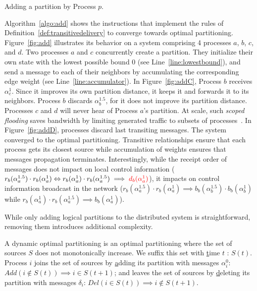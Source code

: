 \begin{algorithm}
  
  \caption{\label{algo:add}Adding a partition by Process $p$.}
\end{algorithm}

Algorithm~\ref{algo:add} shows the instructions that implement the
rules of Definition~\ref{def:transitivedelivery} to converge towards
optimal partitioning. Figure~\ref{fig:add} illustrates its behavior on
a system comprising 4 processes $a$, $b$, $c$, and $d$. Two processes
$a$ and $c$ concurrently create a partition. They initialize their own
state with the lowest possible bound $0$ (see
Line~\ref{line:lowestbound}), and send a message to each of their
neighbors by accumulating the corresponding edge weight (see
Line~\ref{line:accumulator}). In Figure~\ref{fig:addC}, Process $b$
receives $\alpha_{c}^{1}$. Since it improves its own partition
distance, it keeps it and forwards it to its neighbors. Process $b$
discards $\alpha_{b}^{1.5}$, for it does not improve its partition
distance. Processes $c$ and $d$ will never hear of Process $a$'s
partition. At scale, such \emph{scoped flooding} saves bandwidth by
limiting generated traffic to subsets of
processes~\cite{wang2015prodiluvian}. In Figure~\ref{fig:addD},
processes discard last transiting messages. The system converged to
the optimal partitioning.  Transitive relationships ensure that each
process gets its closest source while accumulation of weights ensures
that messages propagation terminates.  Interestingly, while the
receipt order of messages does not impact on local control information
($r_b(\alpha_a^{1.5}) \cdot r_b(\alpha_a^{1}) \Leftrightarrow
r_b(\alpha_a^{1}) \cdot r_b(\alpha_a^{1.5}) \implies
\textcolor{red}{d_b(\alpha_a^{1})}$), it impacts on control information
broadcast in the network ($r_b(\alpha_a^{1.5}) \cdot r_b(\alpha_a^{1})
\implies b_b(\alpha_{b}^{1.5}) \cdot b_b(\alpha_{b}^{1})$ while
$r_b(\alpha_a^{1}) \cdot r_b(\alpha_a^{1.5}) \implies
b_b(\alpha_a^{1})$).

While only adding logical partitions to the distributed system is
straightforward, removing them introduces additional complexity. 

\begin{definition}
  A dynamic optimal partitioning is an optimal partitioning where the
  set of sources $S$ does not monotonically increase. We suffix this
  set with \underline{t}ime $t$ : $S(t)$.  Process $i$ joins the set
  of sources by \underline{a}dding its partition with messages
  $\alpha_i^{0}$: $Add(i \not\in S(t)) \implies i \in S(t+1)$; and
  leaves the set of sources by \underline{d}eleting its partition with
  messages $\delta_i$: $Del(i \in S(t)) \implies i \not\in S(t+1)$.
\end{definition}

